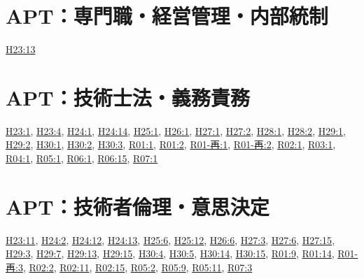 \section{APT：専門職・経営管理・内部統制}
\hyperref[q:h23-reg-apt-13]{H23:13}
\section{APT：技術士法・義務責務}
\hyperref[q:h23-reg-apt-01]{H23:1}, \hyperref[q:h23-reg-apt-04]{H23:4}, \hyperref[q:h24-reg-apt-01]{H24:1}, \hyperref[q:h24-reg-apt-14]{H24:14}, \hyperref[q:h25-reg-apt-01]{H25:1}, \hyperref[q:h26-reg-apt-01]{H26:1}, \hyperref[q:h27-reg-apt-01]{H27:1}, \hyperref[q:h27-reg-apt-02]{H27:2}, \hyperref[q:h28-reg-apt-01]{H28:1}, \hyperref[q:h28-reg-apt-02]{H28:2}, \hyperref[q:h29-reg-apt-01]{H29:1}, \hyperref[q:h29-reg-apt-02]{H29:2}, \hyperref[q:h30-reg-apt-01]{H30:1}, \hyperref[q:h30-reg-apt-02]{H30:2}, \hyperref[q:h30-reg-apt-03]{H30:3}, \hyperref[q:r01-reg-apt-01]{R01:1}, \hyperref[q:r01-reg-apt-02]{R01:2}, \hyperref[q:r01-ret-apt-01]{R01-再:1}, \hyperref[q:r01-ret-apt-02]{R01-再:2}, \hyperref[q:r02-reg-apt-01]{R02:1}, \hyperref[q:r03-reg-apt-01]{R03:1}, \hyperref[q:r04-reg-apt-01]{R04:1}, \hyperref[q:r05-reg-apt-01]{R05:1}, \hyperref[q:r06-reg-apt-01]{R06:1}, \hyperref[q:r06-reg-apt-15]{R06:15}, \hyperref[q:r07-reg-apt-01]{R07:1}
\section{APT：技術者倫理・意思決定}
\hyperref[q:h23-reg-apt-11]{H23:11}, \hyperref[q:h24-reg-apt-02]{H24:2}, \hyperref[q:h24-reg-apt-12]{H24:12}, \hyperref[q:h24-reg-apt-13]{H24:13}, \hyperref[q:h25-reg-apt-06]{H25:6}, \hyperref[q:h25-reg-apt-12]{H25:12}, \hyperref[q:h26-reg-apt-06]{H26:6}, \hyperref[q:h27-reg-apt-03]{H27:3}, \hyperref[q:h27-reg-apt-06]{H27:6}, \hyperref[q:h27-reg-apt-15]{H27:15}, \hyperref[q:h29-reg-apt-03]{H29:3}, \hyperref[q:h29-reg-apt-07]{H29:7}, \hyperref[q:h29-reg-apt-13]{H29:13}, \hyperref[q:h29-reg-apt-15]{H29:15}, \hyperref[q:h30-reg-apt-04]{H30:4}, \hyperref[q:h30-reg-apt-05]{H30:5}, \hyperref[q:h30-reg-apt-14]{H30:14}, \hyperref[q:h30-reg-apt-15]{H30:15}, \hyperref[q:r01-reg-apt-09]{R01:9}, \hyperref[q:r01-reg-apt-14]{R01:14}, \hyperref[q:r01-ret-apt-03]{R01-再:3}, \hyperref[q:r02-reg-apt-02]{R02:2}, \hyperref[q:r02-reg-apt-11]{R02:11}, \hyperref[q:r02-reg-apt-15]{R02:15}, \hyperref[q:r05-reg-apt-02]{R05:2}, \hyperref[q:r05-reg-apt-09]{R05:9}, \hyperref[q:r05-reg-apt-11]{R05:11}, \hyperref[q:r07-reg-apt-03]{R07:3}
